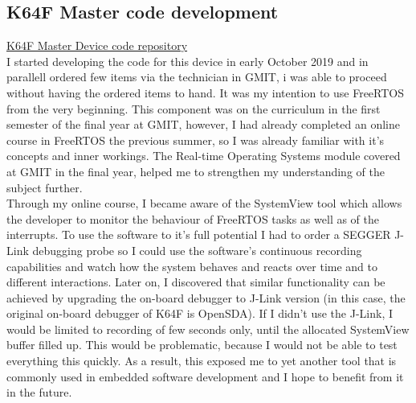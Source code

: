 \documentclass[12pt,a4paper]{article}
\begin{document}
		\subsection{K64F Master code development}
		\href{https://github.com/zedd-1983/project_journal/tree/bt2}{K64F Master Device code repository}\\
		I started developing the code for this device in early October 2019 and in parallell ordered few items via the technician in GMIT, i was able to proceed without having the ordered items to hand.  It was my intention to use FreeRTOS from the very beginning. This component was on the curriculum in the first semester of the final year at GMIT, however, I had already completed an online course in FreeRTOS the previous summer, so I was already familiar with it's concepts and inner workings. The Real-time Operating Systems module covered at GMIT in the final year, helped me to strengthen my understanding of the subject further.\\
		
		Through my online course, I became aware of the SystemView tool which allows the developer to monitor the behaviour of FreeRTOS tasks as well as of the interrupts. To use the software to it's full potential I had to order a SEGGER J-Link debugging probe so I could use the software's continuous recording capabilities and watch how the system behaves and reacts over time and to different interactions. Later on, I discovered that similar functionality can be achieved by upgrading the on-board debugger to J-Link version (in this case, the original on-board debugger of K64F is OpenSDA). If I didn't use the J-Link, I would be limited to recording of few seconds only, until the allocated SystemView buffer filled up. This would be problematic, because I would not be able to test everything this quickly. As a result, this exposed me to yet another tool that is commonly used in embedded software development and I hope to benefit from it in the future.\\
		
\end{document}
